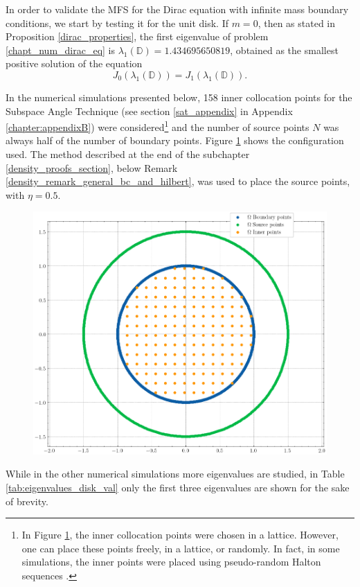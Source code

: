 In order to validate the MFS for the Dirac equation with infinite mass boundary conditions, we start by testing it for the unit disk. If \(m=0\), then as stated in Proposition \ref{dirac_properties}, the first eigenvalue of problem \eqref{chapt_num_dirac_eq} is \(\lambda_1(\mathbb{D})= 1.434695650819\), obtained as the smallest positive solution of the equation
\[
    J_0(\lambda_1(\mathbb{D})) = J_1(\lambda_1(\mathbb{D})).
\]

In the numerical simulations presented below, 158 inner collocation points for the Subspace Angle Technique (see section \ref{sat_appendix} in Appendix \ref{chapter:appendixB}) were considered\footnote{In Figure \ref{dirak_disk_col_m0}, the inner collocation points were chosen in a lattice. However, one can place these points freely, in a lattice, or randomly. In fact, in some simulations, the inner points were placed using pseudo-random Halton sequences \cite{halton1964algorithm}.} and the number of source points \(N\) was always half of the number of boundary points. Figure \ref{dirak_disk_col_m0} shows the configuration used. The method described at the end of the subchapter \ref{density_proofs_section}, below Remark \ref{density_remark_general_bc_and_hilbert}, was used to place the source points, with \(\eta=0.5\). 

\begin{figure}[!htb]
    \centering
    \includegraphics[width=0.5\linewidth]{Images/Dirac/circle_m_0_col_points_158_inner_eta_05.png}
    \label{dirak_disk_col_m0}
\end{figure}

While in the other numerical simulations more eigenvalues are studied, in Table \ref{tab:eigenvalues_disk_val} only the first three eigenvalues are shown for the sake of brevity.

